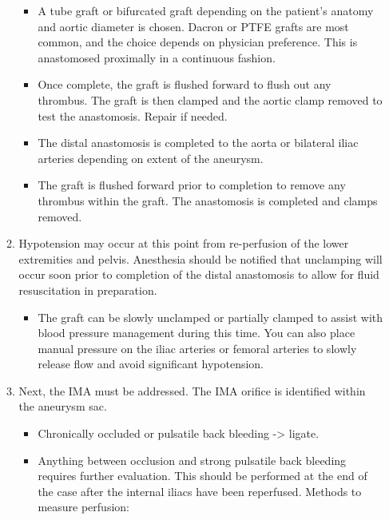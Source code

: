 \documentclass[
]{book}
\providecommand{\tightlist}{%
  \setlength{\itemsep}{0pt}\setlength{\parskip}{0pt}}
\begin{document}
\begin{itemize}
\begin{enumerate}
    \begin{itemize}
    \item
      A tube graft or bifurcated graft depending on the patient's
      anatomy and aortic diameter is chosen. Dacron or PTFE grafts
      are most common, and the choice depends on physician
      preference. This is anastomosed proximally in a continuous
      fashion.
    \item
      Once complete, the graft is flushed forward to flush out any
      thrombus. The graft is then clamped and the aortic clamp
      removed to test the anastomosis. Repair if needed.
    \item
      The distal anastomosis is completed to the aorta or
      bilateral iliac arteries depending on extent of the
      aneurysm.
    \item
      The graft is flushed forward prior to completion to remove
      any thrombus within the graft. The anastomosis is completed
      and clamps removed.
    \end{itemize}
  \item
    Hypotension may occur at this point from re-perfusion of the
    lower extremities and pelvis. Anesthesia should be notified that
    unclamping will occur soon prior to completion of the distal
    anastomosis to allow for fluid resuscitation in preparation.

    \begin{itemize}
    \tightlist
    \item
      The graft can be slowly unclamped or partially clamped to
      assist with blood pressure management during this time. You
      can also place manual pressure on the iliac arteries or
      femoral arteries to slowly release flow and avoid
      significant hypotension.
    \end{itemize}
  \item
    Next, the IMA must be addressed. The IMA orifice is identified
    within the aneurysm sac.

    \begin{itemize}
    \item
      Chronically occluded or pulsatile back bleeding -\textgreater{} ligate.
    \item
      Anything between occlusion and strong pulsatile back
      bleeding requires further evaluation. This should be
      performed at the end of the case after the internal iliacs
      have been reperfused. Methods to measure perfusion:


\end{itemize}
\end{enumerate}
\end{itemize}
\end{document}
